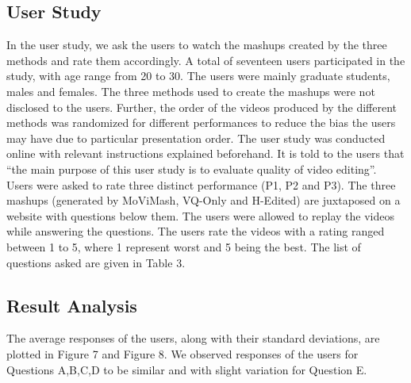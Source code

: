 \documentclass{sig-alternate}
\begin{document}
    \subsection{User Study}
    In the user study, we ask the users to watch the mashups created by the three methods and rate them accordingly. A total of seventeen users participated in the study, with age range from 20 to 30.
    The users were mainly graduate students, males and females. The three methods used to create the mashups were not disclosed to the users. Further, the order of the videos produced by the different methods was randomized for different performances to reduce the bias the users may have due to particular presentation order. The user study was conducted online with relevant instructions explained beforehand. It is told to the users that “the main purpose of this user study is to evaluate quality of video editing”. Users were asked to rate three distinct performance (P1, P2 and P3). The three mashups (generated by MoViMash, VQ-Only and H-Edited) are juxtaposed on a website with questions below them. The users were allowed to replay the videos while answering the questions. The users rate the videos with a rating ranged between 1 to 5, where 1 represent worst and 5 being the best. The list of questions asked are given in Table 3.
    \subsection{Result Analysis}
    The average responses of the users, along with their standard deviations, are plotted in Figure 7 and Figure 8. We observed responses of the users for Questions A,B,C,D to be similar and with slight variation for Question E.
\end{document}
